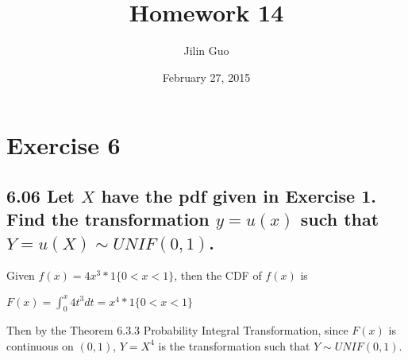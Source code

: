 \documentclass[a4paper]{article}
\title{Homework 14}
\author{Jilin Guo}
\date{February 27, 2015}
\begin{document}
\maketitle

\section*{Exercise 6}
\subsection*{6.06 Let $X$  have the pdf given in Exercise 1. Find the transformation $y = u(x)$ such that $Y = u(X)\sim UNIF(0,1)$.}

Given $f(x) = 4x^3 * 1\{0<x<1\}$, then the CDF of $f(x)$ is

\begin{center}
$F(x) = \int_0^x 4t^3 dt = x^4 * 1\{0<x<1\}$
\end{center}

Then by the Theorem 6.3.3 Probability Integral Transformation, since $F(x)$ is continuous on $(0,1)$, $Y = X^4$ is the transformation such that $Y \sim UNIF(0,1)$.
\end{document}
